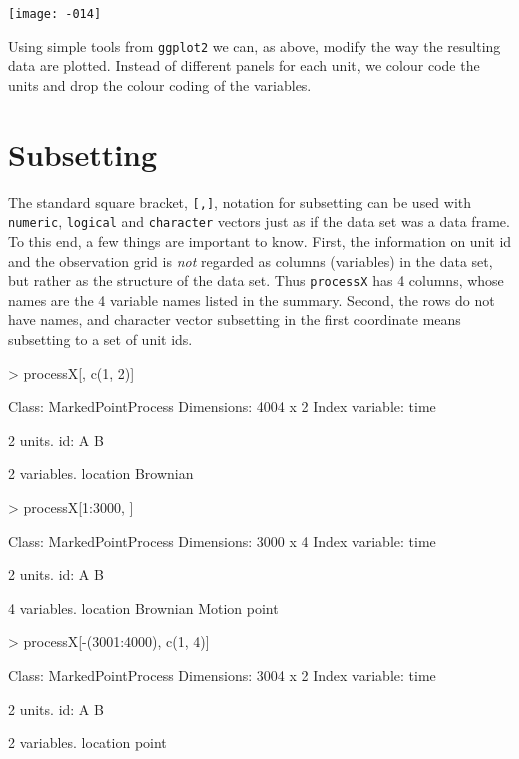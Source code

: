 \documentclass[11pt,a4paper,twoside]{article}
\begin{document}
\texttt{[image: -014]}

Using simple tools from \verb+ggplot2+ we can, as above, modify the
way the resulting data are plotted. Instead of different panels for
each unit, we colour code the units and drop the colour coding of the
variables. 

\section{Subsetting}

The standard square bracket, \verb+[,]+, notation for subsetting can be used with
\verb+numeric+, \verb+logical+ and \verb+character+ vectors just as if
the data set was a data frame. To this end, a few things are
important to know. First, the information on unit
id and the observation grid is \emph{not} regarded as columns
(variables) in the data set, but rather as the structure of the data
set. Thus  \verb+processX+ has 4 columns, whose names are the 4
variable names listed in the summary. Second, the rows do not have
names, and character vector subsetting in the first coordinate means
subsetting to a set of unit ids. 


\begin{Schunk}
\begin{Sinput}
> processX[, c(1, 2)]
\end{Sinput}
\begin{Soutput}
Class: MarkedPointProcess 
Dimensions: 4004 x 2 
Index variable: time 

2 units.
   id: A B

2 variables.
   location Brownian
\end{Soutput}
\begin{Sinput}
> processX[1:3000, ]
\end{Sinput}
\begin{Soutput}
Class: MarkedPointProcess 
Dimensions: 3000 x 4 
Index variable: time 

2 units.
   id: A B

4 variables.
   location Brownian Motion point
\end{Soutput}
\begin{Sinput}
> processX[-(3001:4000), c(1, 4)]
\end{Sinput}
\begin{Soutput}
Class: MarkedPointProcess 
Dimensions: 3004 x 2 
Index variable: time 

2 units.
   id: A B

2 variables.
   location point
\end{Soutput}
\end{Schunk}
\end{document}
